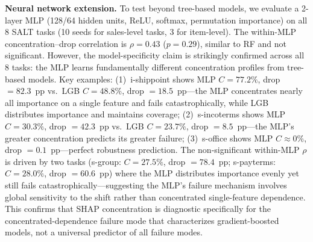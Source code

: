 \documentclass{uai2026} %
\begin{document}
\textbf{Neural network extension.} To test beyond tree-based models, we evaluate a 2-layer MLP (128/64 hidden units, ReLU, softmax, permutation importance) on all 8 SALT tasks (10 seeds for sales-level tasks, 3 for item-level). The within-MLP concentration--drop correlation is $\rho = 0.43$ ($p = 0.29$), similar to RF and not significant. However, the model-specificity claim is strikingly confirmed across all 8 tasks: the MLP learns fundamentally different concentration profiles from tree-based models. Key examples: (1)~i-shippoint shows MLP $C=77.2\%$, drop $= 82.3$~pp vs.\ LGB $C=48.8\%$, drop $= 18.5$~pp---the MLP concentrates nearly all importance on a single feature and fails catastrophically, while LGB distributes importance and maintains coverage; (2)~s-incoterms shows MLP $C=30.3\%$, drop $= 42.3$~pp vs.\ LGB $C=23.7\%$, drop $= 8.5$~pp---the MLP's greater concentration predicts its greater failure; (3)~s-office shows MLP $C \approx 0\%$, drop $= 0.1$~pp---perfect robustness prediction. The non-significant within-MLP $\rho$ is driven by two tasks (s-group: $C=27.5\%$, drop $= 78.4$~pp; s-payterms: $C=28.0\%$, drop $= 60.6$~pp) where the MLP distributes importance evenly yet still fails catastrophically---suggesting the MLP's failure mechanism involves global sensitivity to the shift rather than concentrated single-feature dependence. This confirms that SHAP concentration is diagnostic specifically for the concentrated-dependence failure mode that characterizes gradient-boosted models, not a universal predictor of all failure modes.
\end{document}
